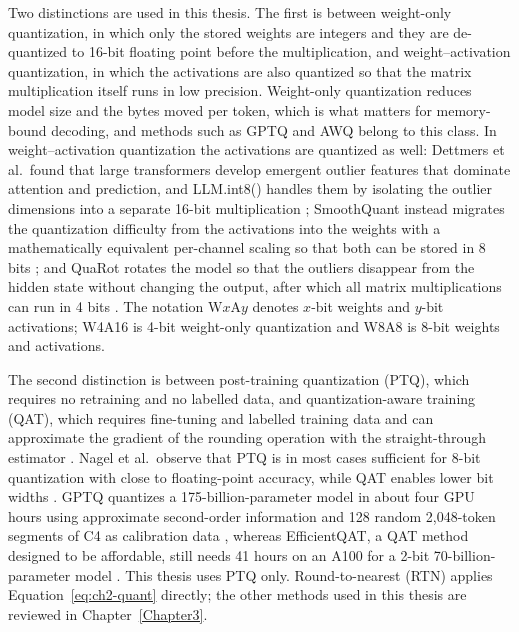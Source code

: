 \documentclass[
11pt, %
english, %
singlespacing, %
headsepline, %
]{MastersDoctoralThesis} %
\begin{document}
Two distinctions are used in this thesis. The first is between weight-only quantization, in which only the stored weights are integers and they are de-quantized to 16-bit floating point before the multiplication, and weight--activation quantization, in which the activations are also quantized so that the matrix multiplication itself runs in low precision. Weight-only quantization reduces model size and the bytes moved per token, which is what matters for memory-bound decoding, and methods such as GPTQ \cite{frantar2023gptq} and AWQ \cite{lin2024awq} belong to this class. In weight--activation quantization the activations are quantized as well: Dettmers et al.\ found that large transformers develop emergent outlier features that dominate attention and prediction, and LLM.int8() handles them by isolating the outlier dimensions into a separate 16-bit multiplication \cite{dettmers2022llmint8}; SmoothQuant instead migrates the quantization difficulty from the activations into the weights with a mathematically equivalent per-channel scaling so that both can be stored in 8 bits \cite{xiao2023smoothquant}; and QuaRot rotates the model so that the outliers disappear from the hidden state without changing the output, after which all matrix multiplications can run in 4 bits \cite{ashkboos2024quarot}. The notation W$x$A$y$ denotes $x$-bit weights and $y$-bit activations; W4A16 is 4-bit weight-only quantization and W8A8 is 8-bit weights and activations.

The second distinction is between post-training quantization (PTQ), which requires no retraining and no labelled data, and quantization-aware training (QAT), which requires fine-tuning and labelled training data and can approximate the gradient of the rounding operation with the straight-through estimator \cite{nagel2021whitepaper}. Nagel et al.\ observe that PTQ is in most cases sufficient for 8-bit quantization with close to floating-point accuracy, while QAT enables lower bit widths \cite{nagel2021whitepaper}. GPTQ quantizes a 175-billion-parameter model in about four GPU hours using approximate second-order information and 128 random 2{,}048-token segments of C4 as calibration data \cite{frantar2023gptq}, whereas EfficientQAT, a QAT method designed to be affordable, still needs 41 hours on an A100 for a 2-bit 70-billion-parameter model \cite{chen2025efficientqat}. This thesis uses PTQ only. Round-to-nearest (RTN) applies Equation~\ref{eq:ch2-quant} directly; the other methods used in this thesis are reviewed in Chapter~\ref{Chapter3}.
\end{document}
